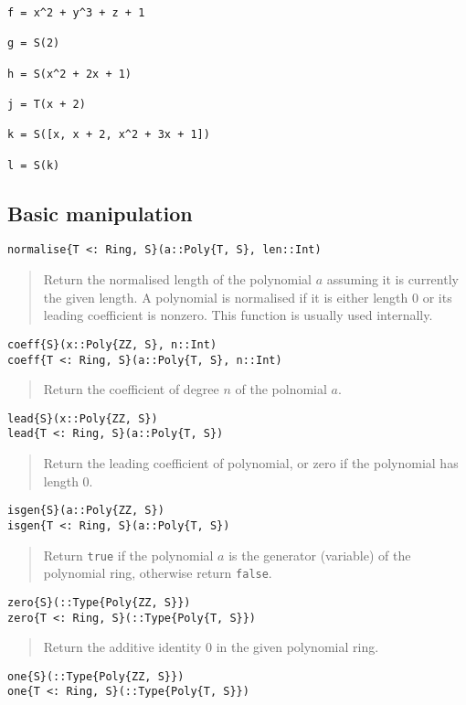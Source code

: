\documentclass[a4paper,10pt]{article}
\newcommand{\code}{\lstinline}
\newcommand{\desc}[1]{\vspace{-3mm}\begin{quote}#1\end{quote}}
\begin{document}
{{{\begin{lstlisting}
f = x^2 + y^3 + z + 1

g = S(2)

h = S(x^2 + 2x + 1)

j = T(x + 2)

k = S([x, x + 2, x^2 + 3x + 1])

l = S(k)
\end{lstlisting}

\subsection{Basic manipulation}

\begin{lstlisting}
normalise{T <: Ring, S}(a::Poly{T, S}, len::Int)
\end{lstlisting}

\desc{Return the normalised length of the polynomial $a$ assuming it is currently
the given length. A polynomial is normalised if it is either length $0$ or its
leading coefficient is nonzero. This function is usually used internally.}

\begin{lstlisting}
coeff{S}(x::Poly{ZZ, S}, n::Int)
coeff{T <: Ring, S}(a::Poly{T, S}, n::Int)
\end{lstlisting}

\desc{Return the coefficient of degree $n$ of the polnomial $a$.}

\begin{lstlisting}
lead{S}(x::Poly{ZZ, S})
lead{T <: Ring, S}(a::Poly{T, S})
\end{lstlisting}

\desc{Return the leading coefficient of polynomial, or zero if the polynomial has
length $0$.}

\begin{lstlisting}
isgen{S}(a::Poly{ZZ, S})
isgen{T <: Ring, S}(a::Poly{T, S})
\end{lstlisting}

\desc{Return \code{true} if the polynomial $a$ is the generator (variable) of the
polynomial ring, otherwise return \code{false}.}

\begin{lstlisting}
zero{S}(::Type{Poly{ZZ, S}})
zero{T <: Ring, S}(::Type{Poly{T, S}})
\end{lstlisting}

\desc{Return the additive identity $0$ in the given polynomial ring.}

\begin{lstlisting}
one{S}(::Type{Poly{ZZ, S}})
one{T <: Ring, S}(::Type{Poly{T, S}})
\end{lstlisting}

}}}
\end{document}
